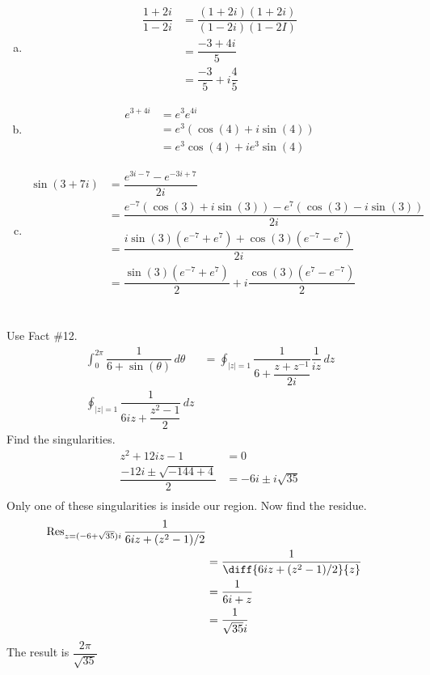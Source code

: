 \documentclass[12pt]{article}
\begin{document}
\section{}
\begin{enumerate}[(a)]
	\item 
	\begin{align*}
		\dfrac{1+2i}{1-2i} &= \dfrac{(1+2i)(1+2i)}{(1-2i)(1-2I)}\\
		&= \dfrac{-3 + 4i}{5}\\
		&= \dfrac{-3}{5} + i\dfrac{4}{5}
	\end{align*}

	\item 
	\begin{align*}
		e^{3+4i} &= e^3e^{4i}\\
		&= e^3 (\cos(4) + i\sin(4))\\
		&= e^3\cos(4) + ie^3\sin(4)
	\end{align*}

	\item 
	\begin{align*}
		\sin(3+7i) &= \dfrac{e^{3i-7}-e^{-3i+7}}{2i}\\
		&= \dfrac{e^{-7}(\cos(3) + i\sin(3)) - e^7(\cos(3)-i\sin(3))}{2i}\\
		&= \dfrac{i\sin(3)(e^{-7}+e^{7}) + \cos(3)(e^{-7}-e^{7})}{2i}\\
		&= \dfrac{\sin(3)(e^{-7}+e^{7})}{2} + i\dfrac{\cos(3)(e^{7}-e^{-7})}{2}
	\end{align*}
\end{enumerate}
\newpage

\section{}
Use Fact \#12.
\begin{align*}
	\int_{0}^{2\pi} \dfrac{1}{6+\sin(\theta)} \,d\theta &= \oint_{|z|=1} \dfrac{1}{6+\dfrac{z+z^{-1}}{2i}} \dfrac{1}{iz} \, dz\\
	\oint_{|z|=1} \dfrac{1}{6iz + \dfrac{z^2-1}{2}} \, dz
\end{align*}
Find the singularities. 
\begin{align*}
	z^2 + 12i z - 1 &= 0\\
	\dfrac{-12i\pm\sqrt{-144 +4}}{2} &= -6i\pm i\sqrt{35}\\
\end{align*}
Only one of these singularities is inside our region. Now find the residue.
\begin{align*}
	\operatorname{Res}_{z=(-6+\sqrt{35})i} \dfrac{1}{6iz + (z^2 - 1)/2}\\
	&= \dfrac{1}{\diff{6iz + (z^2 - 1)/2}{z}}\\
	&= \dfrac{1}{6i+z}\\
	&= \dfrac{1}{\sqrt{35}i}
\end{align*}
The result is $ \dfrac{2\pi}{\sqrt{35}} $
\newpage
\end{document}
